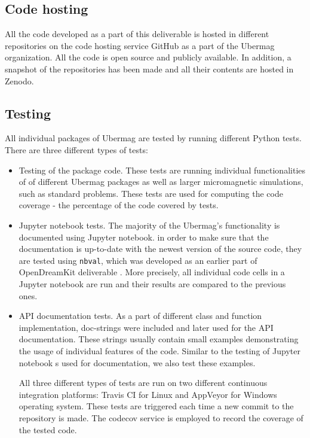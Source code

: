 \documentclass{deliverablereport}
\begin{document}
\subsection{Code hosting}

All the code developed as a part of this deliverable is hosted in different repositories on the code hosting service GitHub as a part of the Ubermag organization. All the code is open source and publicly available. In addition, a snapshot of the repositories has been made and all their contents are hosted in Zenodo.

\subsection{Testing}

All individual packages of Ubermag are tested by running different Python tests. There are three different types of tests:

\begin{itemize}
\item Testing of the package code. These tests are running individual functionalities of of different Ubermag packages as well as larger micromagnetic simulations, such as standard problems. These tests are used for computing the code coverage - the percentage of the code covered by tests.
\item Jupyter notebook tests. The majority of the Ubermag's functionality is documented using Jupyter notebook. in order to make sure that the documentation is up-to-date with the newest version of the source code, they are tested using \texttt{nbval}, which was developed as an earlier part of OpenDreamKit deliverable . More precisely, all individual code cells in a Jupyter notebook are run and their results are compared to the previous ones.
\item API documentation tests. As a part of different class and function implementation, doc-strings were included and later used for the API documentation. These strings usually contain small examples demonstrating the usage of individual features of the code. Similar to the testing of Jupyter notebook s used for documentation, we also test these examples.

  All three different types of tests are run on two different continuous integration platforms: Travis CI for Linux and AppVeyor for Windows operating system. These tests are triggered each time a new commit to the repository is made. The codecov service is employed to record the coverage of the tested code.
\end{itemize}
\end{document}
